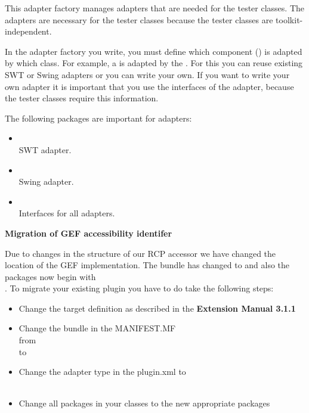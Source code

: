 This adapter factory manages adapters that are needed for the tester classes. The adapters are necessary for the tester classes because the tester classes are toolkit-independent.

In the adapter factory you write, you must define which component () is adapted by which class. For example, a  is adapted by the . For this you can reuse existing SWT or Swing adapters or you can write your own. If you want to write your own adapter it is important that you use the \app{} interfaces of the adapter, because the tester classes require this information.  

The following packages are important for adapters:
\begin{itemize}
\item {}\\ SWT adapter.
\item {}\\ Swing adapter.
\item {}\\Interfaces for all adapters.
\end{itemize}

\textbf{Migration of GEF accessibility identifer}

Due to changes in the structure of our RCP accessor we have changed the location of the GEF implementation. The bundle has changed to  and also the packages now begin with\\ . To migrate your existing plugin you have to do take the following steps:
\begin{itemize}
\item Change the target definition as described in the \textbf{Extension Manual 3.1.1}
\item Change the bundle in the MANIFEST.MF\\ from \\ to 
\item Change the adapter type in the plugin.xml to \\ \\ 
\item Change all packages in your classes to the new appropriate packages
\end{itemize}

